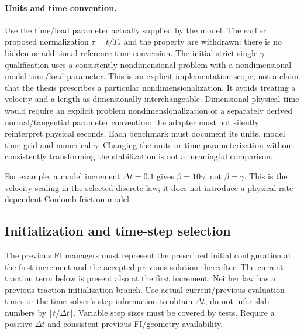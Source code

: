 \documentclass[11pt,a4paper]{article}
\newcommand{\code}[1]{\texttt{\detokenize{#1}}}
\begin{document}
\paragraph{Units and time convention.}
Use the time/load parameter actually supplied by the model. The earlier proposed
normalization $\tau=t/T_*$ and the \code{FrictionTimeScale} property are withdrawn:
there is no hidden or additional reference-time conversion. The initial strict
single-$\gamma$ qualification uses a consistently nondimensional problem with a
nondimensional model time/load parameter. This is an explicit implementation
scope, not a claim that the thesis prescribes a particular nondimensionalization.
It avoids treating a velocity and a length as dimensionally interchangeable.
Dimensional physical time would require an explicit problem nondimensionalization
or a separately derived normal/tangential parameter convention; the adapter must
not silently reinterpret physical seconds. Each benchmark must document its units,
model time grid and numerical $\gamma$. Changing the units or time parameterization
without consistently transforming the stabilization is not a meaningful comparison.

For example, a model increment $\Delta t=0.1$ gives $\beta=10\gamma$, not
$\beta=\gamma$. This is the velocity scaling in the selected discrete law; it
does not introduce a physical rate-dependent Coulomb friction model.

\subsection{Initialization and time-step selection}
The previous FI managers must represent the prescribed initial configuration at
the first increment and the accepted previous solution thereafter. The current
traction term below is present also at the first increment. Neither law has a
previous-traction initialization branch. Use actual current/previous evaluation
times or the time solver's step information to obtain $\Delta t$;
do not infer slab numbers by $\lfloor t/\Delta t\rfloor$. Variable step sizes
must be covered by tests. Require a positive $\Delta t$ and consistent previous
FI/geometry availability.
\end{document}
